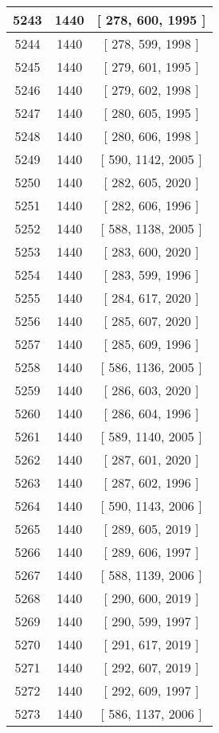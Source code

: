 \begin{center}
\begin{longtable}[H]{|| c c c ||}
\hline
5243 & 1440 & [ 278, 600, 1995 ] \\ 
\hline
5244 & 1440 & [ 278, 599, 1998 ] \\ 
\hline
5245 & 1440 & [ 279, 601, 1995 ] \\ 
\hline
5246 & 1440 & [ 279, 602, 1998 ] \\ 
\hline
5247 & 1440 & [ 280, 605, 1995 ] \\ 
\hline
5248 & 1440 & [ 280, 606, 1998 ] \\ 
\hline
5249 & 1440 & [ 590, 1142, 2005 ] \\ 
\hline
5250 & 1440 & [ 282, 605, 2020 ] \\ 
\hline
5251 & 1440 & [ 282, 606, 1996 ] \\ 
\hline
5252 & 1440 & [ 588, 1138, 2005 ] \\ 
\hline
5253 & 1440 & [ 283, 600, 2020 ] \\ 
\hline
5254 & 1440 & [ 283, 599, 1996 ] \\ 
\hline
5255 & 1440 & [ 284, 617, 2020 ] \\ 
\hline
5256 & 1440 & [ 285, 607, 2020 ] \\ 
\hline
5257 & 1440 & [ 285, 609, 1996 ] \\ 
\hline
5258 & 1440 & [ 586, 1136, 2005 ] \\ 
\hline
5259 & 1440 & [ 286, 603, 2020 ] \\ 
\hline
5260 & 1440 & [ 286, 604, 1996 ] \\ 
\hline
5261 & 1440 & [ 589, 1140, 2005 ] \\ 
\hline
5262 & 1440 & [ 287, 601, 2020 ] \\ 
\hline
5263 & 1440 & [ 287, 602, 1996 ] \\ 
\hline
5264 & 1440 & [ 590, 1143, 2006 ] \\ 
\hline
5265 & 1440 & [ 289, 605, 2019 ] \\ 
\hline
5266 & 1440 & [ 289, 606, 1997 ] \\ 
\hline
5267 & 1440 & [ 588, 1139, 2006 ] \\ 
\hline
5268 & 1440 & [ 290, 600, 2019 ] \\ 
\hline
5269 & 1440 & [ 290, 599, 1997 ] \\ 
\hline
5270 & 1440 & [ 291, 617, 2019 ] \\ 
\hline
5271 & 1440 & [ 292, 607, 2019 ] \\ 
\hline
5272 & 1440 & [ 292, 609, 1997 ] \\ 
\hline
5273 & 1440 & [ 586, 1137, 2006 ] \\ 

\end{longtable}
\end{center}
